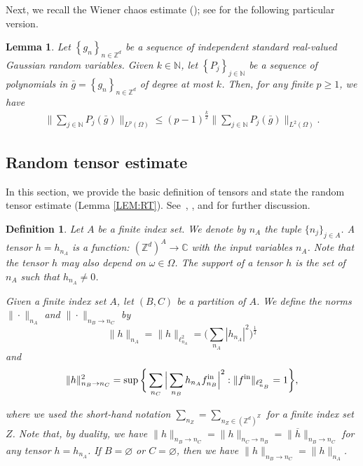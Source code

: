 \documentclass[%
11pt,  reqno]{amsart}
\newtheorem{lemma}[theorem]{Lemma}
\newtheorem{definition}[theorem]{Definition}
\newcommand{\1}{\hspace{0.2mm}\text{I}\hspace{0.2mm}}
\newcommand{\noi}{\noindent}
\newcommand{\Z}{\mathbb{Z}}
\newcommand{\cj}{\overline}
\renewcommand{\l}{\ell}
\renewcommand{\o}{\omega}
\renewcommand{\O}{\Omega}
\newcommand{\N}{\mathbb{N}}
\numberwithin{equation}{section}
\numberwithin{theorem}{section}
\begin{document}
Next, we recall  the Wiener chaos estimate
(\cite[Theorem~I.22]{Simon});
see \cite[Lemma 3.2]{OTz1}
for the following particular version.


\begin{lemma}\label{LEM:hyp}
Let $\left\{g_n\right\}_{n\in \Z^d}$ be a sequence of independent standard real-valued Gaussian
random variables. Given $k\in \N$, let $\left\{P_j\right\}_{j\in \N}$ be a sequence of polynomials in 
$\bar{g}=\left\{g_n\right\}_{n\in \Z^d}$ of degree at most $k$. Then, for any finite $p\ge 1$, we have
\begin{align*}
\bigg\|\sum_{j\in \N}P_j(\bar{g})\bigg\|_{L^p(\Omega)}
\le (p-1)^{\frac{k}{2}}\bigg\|\sum_{j\in \N}P_j(\bar{g})\bigg\|_{L^2(\Omega)}.
\end{align*}
\end{lemma}



\subsection{Random tensor estimate}

In this section, we provide the basic definition of tensors and 
state the random tensor estimate (Lemma \ref{LEM:RT}).
See~\cite[Sections 2 and 4]{DNY3}, \cite[Section 4]{Bring1}, 
and \cite[Appendix C]{OWZ}
for further discussion.

\begin{definition} \label{DEF:tensor} \rm
Let $A$ be a finite index set. We denote by $n_A$ the tuple $ \{n_j \}_{j \in A}$. 
 A tensor $h = h_{n_A}$ is a function: $(\Z^d)^{A} \to \mathbb{C} $ with the input variables $n_A$. Note that the tensor $h$ may also depend on $\o \in \O$. 
 The support of a tensor $h$ is the set of $n_A$ such that $h_{n_A} \neq 0$. 

Given a finite index set  $A$, 
let $(B, C)$ be a partition of $A$. We define the norms 
 $\| \cdot \|_{n_A}$ and 
$\| \cdot \|_{n_{B} \to n_{C}}$ by 
\[ \| h \|_{n_A}  = \|h\|_{\l^2_{n_A}} = \bigg(\sum_{n_A} |h_{n_A}|^2\bigg)^\frac{1}{2}\]
and
\begin{align}
  \| h \|^2_{n_{B} \to n_{C}} = \sup \bigg\{ 
\sum_{n_{C}} \Big| \sum_{n_{B}} h_{n_A} f^\textup{in}_{n_{B}} \Big|^2 :  \| f^\textup{in} \|_{\l^2_{n_{B}}} =1  \bigg\},  
\label{Z0a}
\end{align}


\noi
where  we used the short-hand notation $\sum_{n_Z} = \sum_{n_Z \in (\Z^d)^Z}$ for a finite index set $Z$.
Note that, by duality, we have  $\| h \|_{n_{B} \to n_{C}} = \| h \|_{n_{C} \to n_{B}} 
= \| \cj h \|_{n_{B} \to n_{C}}$ for any tensor $h = h_{n_A}$. 
If $B = \varnothing$ or $C = \varnothing$,  then we have
$  \| h \|_{n_{B} \to n_{C}} = \| h \|_{n_A}$.
\end{definition}
\end{document}
